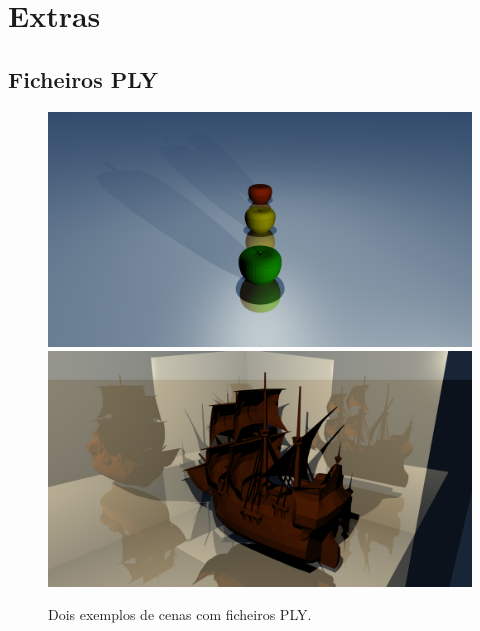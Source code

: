 \documentclass{article}
\begin{document}
    \section*{Extras}  
        \subsection*{Ficheiros PLY}
            \par
            \begin{figure}[h!]
                \centering
                \includegraphics[scale=0.122]{apple}
                \includegraphics[scale=0.122]{boat}
                \caption{Dois exemplos de cenas com ficheiros PLY.}
            \end{figure} 
\end{document}
